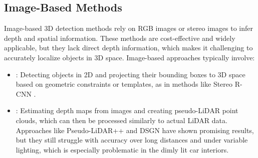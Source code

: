 \subsection{Image-Based Methods}
Image-based 3D detection methods rely on RGB images or stereo images 
to infer depth and spatial information. These methods are cost-effective 
and widely applicable, but they lack direct depth information, 
which makes it challenging to accurately localize objects in 3D space. 
Image-based approaches typically involve:
\begin{itemize}
    \item {}: Detecting objects in 2D and projecting 
    their bounding boxes to 3D space based on geometric constraints or 
    templates, as in methods like Stereo R-CNN \cite{stereo_rcnn}.
    \item {}: Estimating depth maps from images 
    and creating pseudo-LiDAR \cite{pseudo_lidar} point clouds, 
    which can then be processed similarly to actual LiDAR data. 
    Approaches like Pseudo-LiDAR++ \cite{pseudo_lidar++} and 
    DSGN \cite{dsgn} have shown promising results, but 
    they still struggle with accuracy over long distances and under 
    variable lighting, which is especially problematic in the dimly lit car interiors.
\end{itemize}


